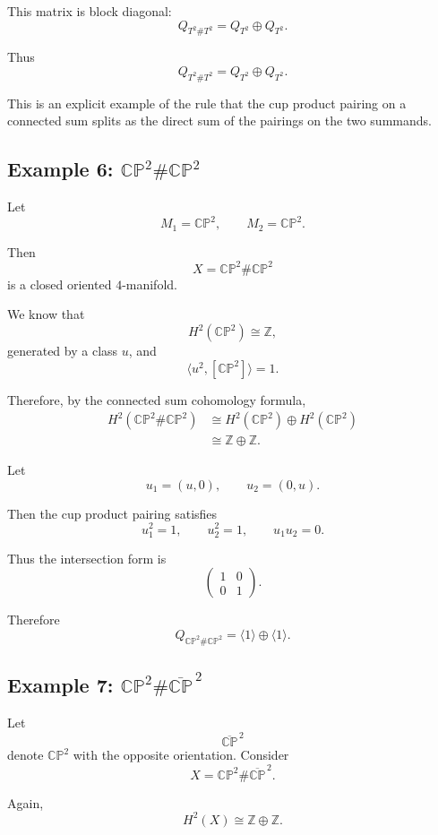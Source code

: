 \documentclass[12pt,a4paper]{article}
\theoremstyle{notespace}
\begin{document}
This matrix is block diagonal:
\[
Q_{T^2\#T^2}
=
Q_{T^2}\oplus Q_{T^2}.
\]

Thus
\[
\boxed{
	Q_{T^2\#T^2}
	=
	Q_{T^2}\oplus Q_{T^2}.
}
\]

This is an explicit example of the rule that the cup product pairing on a
connected sum splits as the direct sum of the pairings on the two summands.

\subsection{Example 6: \texorpdfstring{$\mathbb{CP}^2\# \mathbb{CP}^2$}{CP2 connected sum CP2}}

Let
\[
M_1=\mathbb{CP}^2,
\qquad
M_2=\mathbb{CP}^2.
\]

Then
\[
X=\mathbb{CP}^2\#\mathbb{CP}^2
\]
is a closed oriented \(4\)-manifold.

We know that
\[
H^2(\mathbb{CP}^2)\cong \mathbb{Z},
\]
generated by a class \(u\), and
\[
\langle u^2,[\mathbb{CP}^2]\rangle=1.
\]

Therefore, by the connected sum cohomology formula,
\[
\begin{aligned}
	H^2(\mathbb{CP}^2\#\mathbb{CP}^2)
	&\cong
	H^2(\mathbb{CP}^2)\oplus H^2(\mathbb{CP}^2) \\
	&\cong
	\mathbb{Z}\oplus \mathbb{Z}.
\end{aligned}
\]

Let
\[
u_1=(u,0),
\qquad
u_2=(0,u).
\]

Then the cup product pairing satisfies
\[
u_1^2=1,
\qquad
u_2^2=1,
\qquad
u_1u_2=0.
\]

Thus the intersection form is
\[
\begin{pmatrix}
	1 & 0\\
	0 & 1
\end{pmatrix}.
\]

Therefore
\[
\boxed{
	Q_{\mathbb{CP}^2\#\mathbb{CP}^2}
	=
	\langle 1\rangle\oplus \langle 1\rangle.
}
\]

\subsection{Example 7: \texorpdfstring{$\mathbb{CP}^2\#\overline{\mathbb{CP}}^{\,2}$}{CP2 connected sum CP2bar}}

Let
\[
\overline{\mathbb{CP}}^{\,2}
\]
denote \(\mathbb{CP}^2\) with the opposite orientation. Consider
\[
X=\mathbb{CP}^2\#\overline{\mathbb{CP}}^{\,2}.
\]

Again,
\[
H^2(X)
\cong
\mathbb{Z}\oplus \mathbb{Z}.
\]
\end{document}
